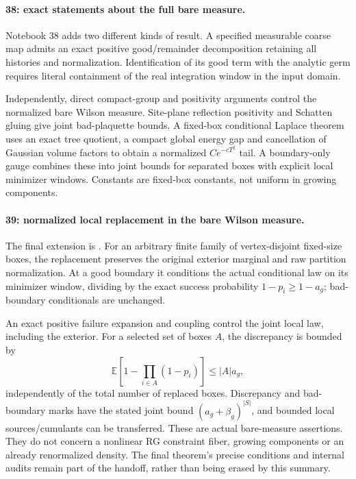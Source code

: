 \paragraph{38: exact statements about the full bare measure.}
Notebook 38 adds two different kinds
of result. A specified measurable coarse
map admits an exact positive good/remainder
decomposition retaining all histories
and normalization. Identification of
its good term with the analytic germ
requires literal containment of the real
integration window in the input domain.

Independently, direct compact-group
and positivity arguments control the
normalized bare Wilson measure.
Site-plane reflection positivity and
Schatten gluing give joint bad-plaquette
bounds. A fixed-box conditional Laplace
theorem uses an exact tree quotient,
a compact global energy gap and
cancellation of Gaussian volume factors
to obtain a normalized \(Ce^{-cT^2}\)
tail. A boundary-only gauge combines
these into joint bounds for separated
boxes with explicit local minimizer
windows. Constants are fixed-box
constants, not uniform in growing
components.

\paragraph{39: normalized local replacement in the bare Wilson measure.}
The final extension is
.
For an arbitrary finite family of
vertex-disjoint fixed-size boxes,
the replacement preserves the original
exterior marginal and raw partition
normalization. At a good boundary it
conditions the actual conditional law
on its minimizer window, dividing by
the exact success probability
\(1-p_i\geq1-a_g\); bad-boundary
conditionals are unchanged.

An exact positive failure expansion
and coupling control the joint local
law, including the exterior. For a
selected set of boxes \(A\), the
discrepancy is bounded by
\[
 \mathbb E\!\left[1-\prod_{i\in A}(1-p_i)\right]
 \leq |A|a_g ,
\]
independently of the total number of
replaced boxes. Discrepancy and bad-boundary
marks have the stated joint bound
\((a_g+\beta_g)^{|S|}\), and bounded
local sources/cumulants can be transferred.
These are actual bare-measure assertions.
They do not concern a nonlinear
RG constraint fiber, growing components
or an already renormalized density.
The final theorem's precise conditions
and internal audits remain part of
the handoff, rather than being erased
by this summary.

